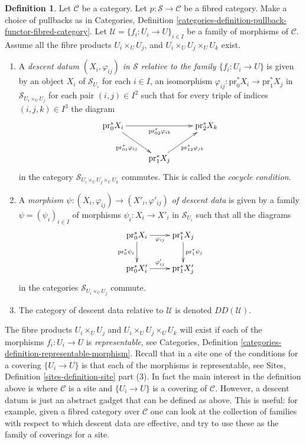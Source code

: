 \documentclass{stacks-project}
\theoremstyle{plain}
\theoremstyle{definition}
\newtheorem{definition}[subsection]{Definition}
\theoremstyle{remark}
\numberwithin{equation}{subsection}
\begin{document}
\begin{definition}
\label{definition-descent-data}
Let $\mathcal{C}$ be a category.
Let $p : \mathcal{S} \to \mathcal{C}$ be a fibred category.
Make a choice of pullbacks as in Categories,
Definition \ref{categories-definition-pullback-functor-fibred-category}.
Let $\mathcal{U} = \{f_i : U_i \to U\}_{i \in I}$
be a family of morphisms of $\mathcal{C}$. Assume all the fibre products
$U_i \times_U U_j$, and $U_i \times_U U_j \times_U U_k$ exist.
\begin{enumerate}
\item A {\it descent datum $(X_i, \varphi_{ij})$ in $\mathcal{S}$
relative to the family $\{f_i : U_i \to U\}$} is given by an object $X_i$
of $\mathcal{S}_{U_i}$ for each $i \in I$, an isomorphism
$\varphi_{ij} : \text{pr}_0^*X_i \to \text{pr}_1^*X_j$
in $\mathcal{S}_{U_i \times_U U_j}$ for each pair $(i, j) \in I^2$
such that for every triple of indices $(i, j, k) \in I^3$ the
diagram
$$
\xymatrix{
\text{pr}_0^*X_i \ar[rd]_{\text{pr}_{01}^*\varphi_{ij}}
\ar[rr]_{\text{pr}_{02}^*\varphi_{ik}} & &
\text{pr}_2^*X_k \\
& \text{pr}_1^*X_j \ar[ru]_{\text{pr}_{12}^*\varphi_{jk}} &
}
$$
in the category $\mathcal{S}_{U_i \times_U U_j \times_U U_k}$
commutes. This is called the {\it cocycle condition}.
\item A {\it morphism $\psi : (X_i, \varphi_{ij}) \to
(X'_i, \varphi'_{ij})$ of descent data} is given
by a family $\psi = (\psi_i)_{i\in I}$ of morphisms
$\psi_i : X_i \to X'_i$ in $\mathcal{S}_{U_i}$
such that all the diagrams
$$
\xymatrix{
\text{pr}_0^*X_i \ar[r]_{\varphi_{ij}} \ar[d]_{\text{pr}_0^*\psi_i}
& \text{pr}_1^*X_j \ar[d]^{\text{pr}_1^*\psi_j} \\
\text{pr}_0^*X'_i \ar[r]^{\varphi'_{ij}} &
\text{pr}_1^*X'_j \\
}
$$
in the categories $\mathcal{S}_{U_i \times_U U_j}$ commute.
\item The category of descent data relative to
$\mathcal{U}$ is denoted $DD(\mathcal{U})$.
\end{enumerate}
\end{definition}

\noindent
The fibre products $U_i \times_U U_j$ and $U_i \times_U U_j \times_U U_k$
will exist if each of the morphisms $f_i : U_i \to U$ is {\it representable},
see Categories, Definition \ref{categories-definition-representable-morphism}.
Recall that in a site one of the conditions for a covering $\{U_i \to U\}$ is
that each of the morphisms is representable, see
Sites, Definition \ref{sites-definition-site} part (3).
In fact the main interest in the definition above is where $\mathcal{C}$
is a site and $\{U_i \to U\}$ is a covering of $\mathcal{C}$. However,
a descent datum is just an abstract gadget that can be defined as above.
This is useful: for example, given a fibred category over $\mathcal{C}$
one can look at the collection of families with respect to which descent data
are effective, and try to use these as the family of coverings for a site.
\end{document}
